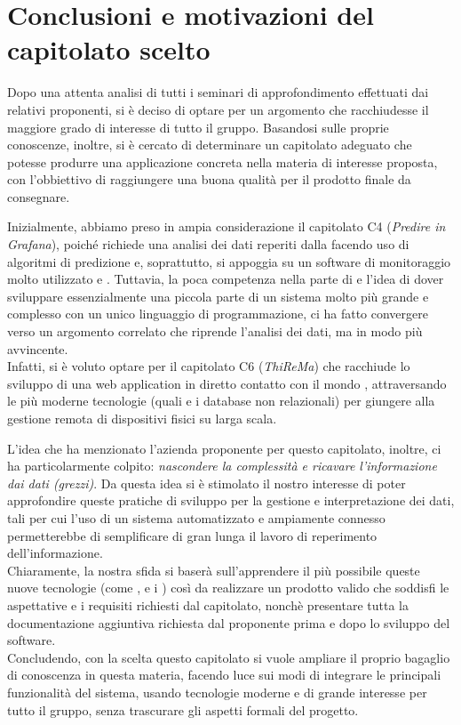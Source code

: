 \section{Conclusioni e motivazioni del capitolato scelto}

Dopo una attenta analisi di tutti i seminari di approfondimento effettuati dai relativi proponenti, si è deciso di optare per un argomento che racchiudesse il maggiore grado di interesse di tutto il gruppo. Basandosi sulle proprie conoscenze, inoltre, si è cercato di determinare un capitolato adeguato che potesse produrre una applicazione concreta nella materia di interesse proposta, con l'obbiettivo di raggiungere una buona qualità per il prodotto finale da consegnare.

Inizialmente, abbiamo preso in ampia considerazione il capitolato C4 (\textit{Predire in Grafana}), poiché richiede una analisi dei dati reperiti dalla  facendo uso di algoritmi di predizione e, soprattutto, si appoggia su un software di monitoraggio molto utilizzato e . Tuttavia, la poca competenza nella parte di  e l'idea di dover sviluppare essenzialmente una piccola parte di un sistema molto più grande e complesso con un unico linguaggio di programmazione, ci ha fatto convergere verso un argomento correlato che riprende l'analisi dei dati, ma in modo più avvincente. \\
Infatti, si è voluto optare per il capitolato C6 (\textit{ThiReMa}) che racchiude lo sviluppo di una web application in diretto contatto con il mondo , attraversando le più moderne tecnologie (quali  e i database non relazionali) per giungere alla gestione remota di dispositivi fisici su larga scala.

L'idea che ha menzionato l'azienda proponente per questo capitolato, inoltre, ci ha particolarmente colpito: \textit{nascondere la complessità e ricavare l'informazione dai dati (grezzi)}. Da questa idea si è stimolato il nostro interesse di poter approfondire queste pratiche di sviluppo per la gestione e interpretazione dei dati, tali per cui l'uso di un sistema automatizzato e ampiamente connesso permetterebbe di semplificare di gran lunga il lavoro di reperimento dell'informazione. \\
Chiaramente, la nostra sfida si baserà sull'apprendere il più possibile queste nuove tecnologie (come ,  e i ) così da realizzare un prodotto valido che soddisfi le aspettative e i requisiti richiesti dal capitolato, nonchè presentare tutta la documentazione aggiuntiva richiesta dal proponente prima e dopo lo sviluppo del software. \\
Concludendo, con la scelta questo capitolato si vuole ampliare il proprio bagaglio di conoscenza in questa materia, facendo luce sui modi di integrare le principali funzionalità del sistema, usando tecnologie moderne e di grande interesse per tutto il gruppo, senza trascurare gli aspetti formali del progetto.
